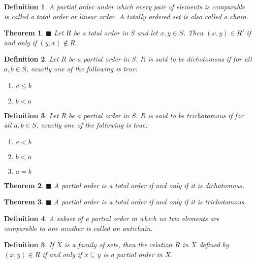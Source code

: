 \documentclass[a4paper]{article}
\newtheorem{mytheorem}{Theorem}
\newtheorem{mydef}{Definition}
\numberwithin{mytheorem}{section}
\numberwithin{mydef}{section}
\numberwithin{axiom}{section}
\numberwithin{example}{section}
\newcommand{\done}{$\blacksquare$ }
\begin{document}
\begin{mydef} A partial order under which every pair of elements is comparable is called a total order or linear order. A totally ordered set is also called a chain. 
\end{mydef}

\begin{mytheorem} \done Let $R$ be a total order in $S$ and let $x,y \in S$. Then $(x,y) \in R'$ if and only if $(y,x) \notin R$. 
\end{mytheorem}

\begin{mydef} Let $R$ be a partial order in $S$. $R$ is said to be dichotomous if for all $a,b \in S$, exactly one of the following is true: 
 \begin{enumerate}
 \item $a \leq b$
 \item $b < a$
 \end{enumerate}
\end{mydef}

\begin{mydef} Let $R$ be a partial order in $S$. $R$ is said to be trichotomous if for all $a,b \in S$, exactly one of the following is true: 
 \begin{enumerate}
 \item $a < b$
 \item $b < a$
 \item $a = b$
 \end{enumerate}
\end{mydef}

\begin{mytheorem} \done A partial order is a total order if and only if it is dichotomous.
\end{mytheorem}

\begin{mytheorem} \done A partial order is a total order if and only if it is trichotomous.
\end{mytheorem}

\begin{mydef} A subset of a partial order in which no two elements are comparable to one another is called an antichain.
\end{mydef}

\begin{mydef} If $X$ is a family of sets, then the relation $R$ in $X$ defined by $(x,y) \in R$ if and only if $x \subseteq y$ is a partial order in $X$.
\end{mydef}
\end{document}
